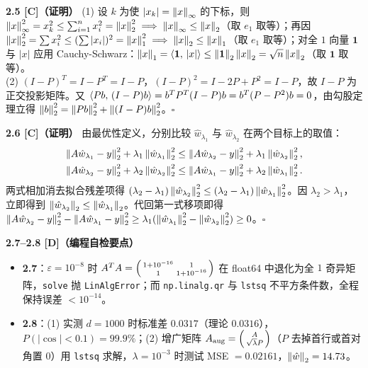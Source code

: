 \textbf{2.5 [C]（证明）}
(1) 设 $k$ 为使 $|x_k| = \left\|x\right\|_\infty$ 的下标，则 $\left\|x\right\|_\infty^2 = x_k^2 \le \sum_{i=1}^n x_i^2 = \left\|x\right\|_2^2 \implies \left\|x\right\|_\infty \le \left\|x\right\|_2$（取 $e_1$ 取等）；再因 $\left\|x\right\|_2^2 = \sum x_i^2 \le (\sum |x_i|)^2 = \left\|x\right\|_1^2 \implies \left\|x\right\|_2 \le \left\|x\right\|_1$（取 $e_1$ 取等）；对全 $1$ 向量 $\mathbf{1}$ 与 $|x|$ 应用 Cauchy-Schwarz：$\left\|x\right\|_1 = \left\langle \mathbf{1},\, |x| \right\rangle \le \left\|\mathbf{1}\right\|_2 \left\|x\right\|_2 = \sqrt{n}\left\|x\right\|_2$（取 $\mathbf{1}$ 取等）。\\
(2) $(I-P)^T = I-P^T = I-P$，$(I-P)^2 = I-2P+P^2 = I-P$，故 $I-P$ 为正交投影矩阵。又 $\left\langle Pb,\, (I-P)b \right\rangle = b^T P^T(I-P)b = b^T(P-P^2)b = 0$，由勾股定理立得 $\left\|b\right\|_2^2 = \left\|Pb\right\|_2^2 + \left\|(I-P)b\right\|_2^2$。$\square$

\textbf{2.6 [C]（证明）}
由最优性定义，分别比较 $\hat{w}_{\lambda_1}$ 与 $\hat{w}_{\lambda_2}$ 在两个目标上的取值：
\begin{align*}
  \left\|A\hat{w}_{\lambda_1}-y\right\|_2^2 + \lambda_1 \left\|\hat{w}_{\lambda_1}\right\|_2^2
  &\le \left\|A\hat{w}_{\lambda_2}-y\right\|_2^2 + \lambda_1 \left\|\hat{w}_{\lambda_2}\right\|_2^2, \\
  \left\|A\hat{w}_{\lambda_2}-y\right\|_2^2 + \lambda_2 \left\|\hat{w}_{\lambda_2}\right\|_2^2
  &\le \left\|A\hat{w}_{\lambda_1}-y\right\|_2^2 + \lambda_2 \left\|\hat{w}_{\lambda_1}\right\|_2^2.
\end{align*}
两式相加消去拟合残差项得 $(\lambda_2 - \lambda_1)\left\|\hat{w}_{\lambda_2}\right\|_2^2 \le (\lambda_2 - \lambda_1)\left\|\hat{w}_{\lambda_1}\right\|_2^2$。因 $\lambda_2 > \lambda_1$，立即得到 $\left\|\hat{w}_{\lambda_2}\right\|_2 \le \left\|\hat{w}_{\lambda_1}\right\|_2$。代回第一式移项即得 $\left\|A\hat{w}_{\lambda_2}-y\right\|_2^2 - \left\|A\hat{w}_{\lambda_1}-y\right\|_2^2 \ge \lambda_1(\left\|\hat{w}_{\lambda_1}\right\|_2^2 - \left\|\hat{w}_{\lambda_2}\right\|_2^2) \ge 0$。$\square$

\textbf{2.7--2.8 [D]（编程自检要点）}
\begin{itemize}
  \item \textbf{2.7}：$\varepsilon=10^{-8}$ 时 $A^TA = \begin{psmallmatrix}1+10^{-16} & 1\\ 1 & 1+10^{-16}\end{psmallmatrix}$ 在 float64 中退化为全 $1$ 奇异矩阵，\texttt{solve} 抛 \texttt{LinAlgError}；而 \texttt{np.linalg.qr} 与 \texttt{lstsq} 不平方条件数，全程保持误差 $<10^{-14}$。
  \item \textbf{2.8}：(1) 实测 $d=1000$ 时标准差 $0.0317$（理论 $0.0316$），$P(|\cos|<0.1)=99.9\%$；(2) 增广矩阵 $A_{\text{aug}} = \begin{psmallmatrix}A\\ \sqrt{\lambda} P\end{psmallmatrix}$（$P$ 去掉首行或首对角置 $0$）用 \texttt{lstsq} 求解，$\lambda=10^{-3}$ 时测试 MSE $= 0.02161$，$\left\|\hat{w}\right\|_2 = 14.73$。
\end{itemize}

